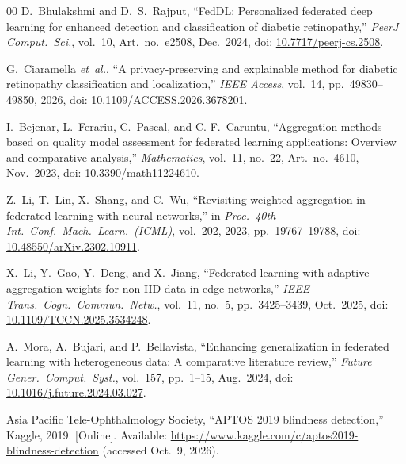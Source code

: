 \begin{thebibliography}{00}
D.~Bhulakshmi and D.~S.~Rajput, ``FedDL: Personalized federated deep
learning for enhanced detection and classification of diabetic
retinopathy,'' \textit{PeerJ Comput.\ Sci.}, vol.~10, Art.~no.~e2508,
Dec.~2024,
doi: \href{https://doi.org/10.7717/peerj-cs.2508}{10.7717/peerj-cs.2508}.

G.~Ciaramella \textit{et~al.}, ``A privacy-preserving and explainable
method for diabetic retinopathy classification and localization,''
\textit{IEEE Access}, vol.~14, pp.~49830--49850, 2026,
doi: \href{https://doi.org/10.1109/ACCESS.2026.3678201}{10.1109/ACCESS.2026.3678201}.

I.~Bejenar, L.~Ferariu, C.~Pascal, and C.-F.~Caruntu, ``Aggregation
methods based on quality model assessment for federated learning
applications: Overview and comparative analysis,''
\textit{Mathematics}, vol.~11, no.~22, Art.~no.~4610, Nov.~2023,
doi: \href{https://doi.org/10.3390/math11224610}{10.3390/math11224610}.

Z.~Li, T.~Lin, X.~Shang, and C.~Wu, ``Revisiting weighted aggregation in
federated learning with neural networks,'' in \textit{Proc.\ 40th Int.\
Conf.\ Mach.\ Learn.\ (ICML)}, vol.~202, 2023, pp.~19767--19788,
doi: \href{https://doi.org/10.48550/arXiv.2302.10911}{10.48550/arXiv.2302.10911}.

X.~Li, Y.~Gao, Y.~Deng, and X.~Jiang, ``Federated learning with adaptive
aggregation weights for non-IID data in edge networks,'' \textit{IEEE
Trans.\ Cogn.\ Commun.\ Netw.}, vol.~11, no.~5, pp.~3425--3439,
Oct.~2025,
doi: \href{https://doi.org/10.1109/TCCN.2025.3534248}{10.1109/TCCN.2025.3534248}.

A.~Mora, A.~Bujari, and P.~Bellavista, ``Enhancing generalization in
federated learning with heterogeneous data: A comparative literature
review,'' \textit{Future Gener.\ Comput.\ Syst.}, vol.~157, pp.~1--15,
Aug.~2024,
doi: \href{https://doi.org/10.1016/j.future.2024.03.027}{10.1016/j.future.2024.03.027}.

Asia Pacific Tele-Ophthalmology Society, ``APTOS 2019 blindness detection,''
Kaggle, 2019. [Online]. Available:
\url{https://www.kaggle.com/c/aptos2019-blindness-detection} (accessed Oct.~9, 2026).

\end{thebibliography}
